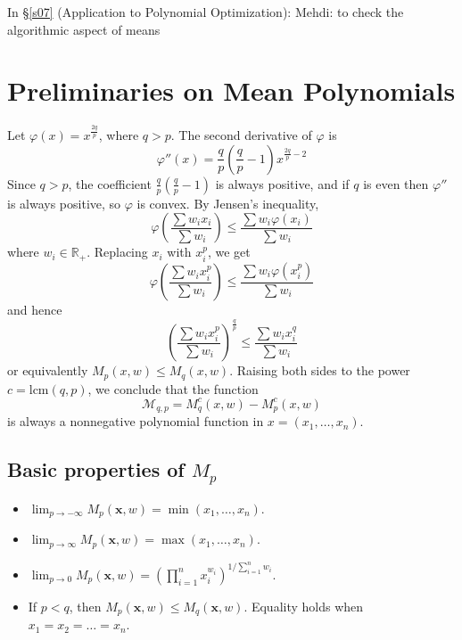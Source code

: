 \documentclass{article}
\begin{document}
In \S\ref{s07} (Application to Polynomial Optimization): Mehdi: to check the algorithmic aspect of means 



\section{Preliminaries on Mean Polynomials}\label{s01}

Let $\varphi(x) = x^{\frac{2q}{p}}$, where $q > p$. The second derivative of $\varphi$ is
\[
   \varphi''(x) = \frac{q}{p}\left(\frac{q}{p}-1\right)x^{\frac{2q}{p}-2}
\]
Since $q > p$, the coefficient $\frac{q}{p}\left(\frac{q}{p}-1\right)$ is always positive, and if $q$ is even then 
$\varphi''$ is always positive, so $\varphi$ is convex. By Jensen's inequality,
\[
   \varphi\left(\frac{\sum w_i x_i}{\sum w_i}\right) \leq \frac{\sum w_i \varphi(x_i)}{\sum w_i}
\]
where $w_i \in \mathbb{R}_+$. Replacing $x_i$ with $x_i^p$, we get
\[
   \varphi\left(\frac{\sum w_i x_i^p}{\sum w_i}\right) \leq \frac{\sum w_i \varphi(x_i^p)}{\sum w_i}
\]
and hence
\[
   \left(\frac{\sum w_i x_i^p}{\sum w_i}\right)^{\frac{q}{p}} \leq \frac{\sum w_i x_i^{q}}{\sum w_i}
\]
or equivalently $M_p(x, w) \leq M_q(x, w)$. Raising both sides to the power $c = \mathrm{lcm}(q, p)$, we conclude that 
the function
\[
   \mathcal{M}_{q,p} = M_q^c(x, w) - M_p^c(x, w)
\]
is always a nonnegative polynomial function in $x = (x_1, \dots, x_n)$.

\subsection*{Basic properties of $M_p$}
\begin{itemize}
   \item $\displaystyle \lim_{p \rightarrow -\infty} M_p(\mathbf{x}, w) = \min(x_1, \dots, x_n)$.
   \item $\displaystyle \lim_{p \rightarrow \infty} M_p(\mathbf{x}, w) = \max(x_1, \dots, x_n)$.
   \item $\displaystyle \lim_{p \rightarrow 0} M_p(\mathbf{x}, w) = \left( \prod_{i=1}^n x_i^{w_i} \right)^{1/\sum_{i=1}^n w_i}$.
   \item If $p < q$, then $M_p(\mathbf{x}, w) \leq M_q(\mathbf{x}, w)$. Equality holds when $x_1 = x_2 = \dots = x_n$.
\end{itemize}
\end{document}
